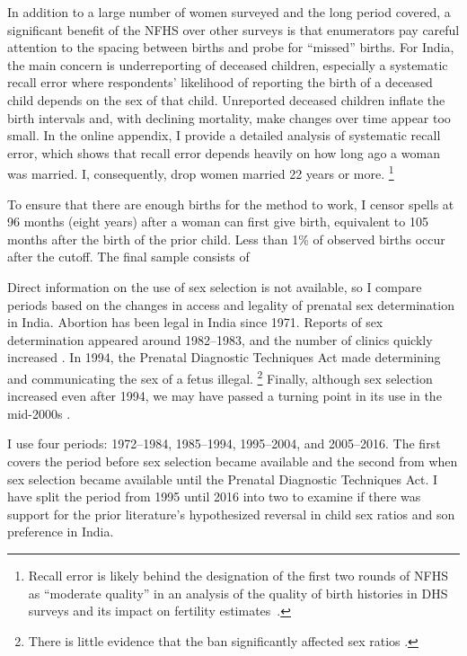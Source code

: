 \documentclass[12pt,letterpaper]{article}
\begin{document}
In addition to a large number of women surveyed and the long period covered, a significant 
benefit of the NFHS over other surveys is that enumerators pay careful attention to the 
spacing between births and probe for ``missed'' births.
For India, the main concern is underreporting of deceased children, especially a systematic 
recall error where respondents' likelihood of reporting the birth of a deceased child depends 
on the sex of that child.
Unreported deceased children inflate the birth intervals and, with declining mortality, 
make changes over time appear too small.
In the online appendix, I provide a detailed analysis of systematic recall error, which 
shows that recall error depends heavily on how long ago a woman was married. 
I, consequently, drop women married 22 years or more.%
\footnote{
Recall error is likely behind the designation of the first two rounds of NFHS as ``moderate 
quality'' in an analysis of the quality of birth histories in DHS surveys and its impact 
on fertility estimates \citep{Schoumaker2014}.
}

To ensure that there are enough births for the method to work, I censor spells at 96 
months (eight years) after a woman can first give birth, equivalent to 105 months 
after the birth of the prior child.
Less than 1\% of observed births occur after the cutoff.
The final sample consists of 


% 

Direct information on the use of sex selection is not available, so I compare periods 
based on the changes in access and legality of prenatal sex determination in India.
Abortion has been legal in India since 1971.
Reports of sex determination appeared around 1982--1983, and the number of clinics 
quickly increased \citep{Sudha1999,bhat06,Grover2006}.
In 1994, the Prenatal Diagnostic Techniques Act made determining and communicating 
the sex of a fetus illegal.%
\footnote{
There is little evidence that the ban significantly affected sex ratios \citep{Das-Gupta2019}.
}
Finally, although sex selection increased even after 1994, we may have passed a 
turning point in its use in the mid-2000s \citep{Das_Gupta2009,Kumar2012,Bongaarts2013,Diamond-Smith2015}.

I use four periods: 1972--1984, 1985--1994, 1995--2004, and 2005--2016.
The first covers the period before sex selection became available and the second from when sex 
selection became available until the Prenatal Diagnostic Techniques Act.
I have split the period from 1995 until 2016 into two to examine if there was support for 
the prior literature's hypothesized reversal in child sex ratios and son 
preference in India.
\end{document}
